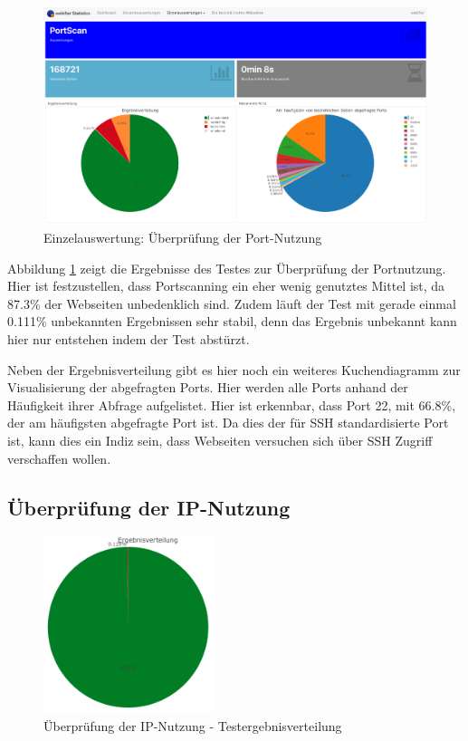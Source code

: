 \begin{figure}[H]
  \centering
  \includegraphics[width=15cm]{images/stats/portscan}
  \caption[Einzelauswertung: Überprüfung der Port-Nutzung]{Einzelauswertung: Überprüfung der Port-Nutzung\protect\footnotemark}
  \label{fig:analyse-portscan}
\end{figure}

Abbildung \ref{fig:analyse-portscan} zeigt die Ergebnisse des Testes zur Überprüfung der
Portnutzung.
Hier ist festzustellen, dass Portscanning ein eher wenig genutztes Mittel ist, da 87.3\% der Webseiten unbedenklich sind. Zudem läuft der Test mit gerade einmal 0.111\% unbekannten Ergebnissen sehr stabil, denn das Ergebnis unbekannt kann hier nur entstehen indem der Test abstürzt.

Neben der Ergebnisverteilung gibt es hier noch ein weiteres Kuchendiagramm zur Visualisierung der abgefragten Ports. Hier werden alle Ports anhand der Häufigkeit ihrer Abfrage aufgelistet. Hier ist erkennbar, dass Port 22, mit 66.8\%, der am häufigsten abgefragte Port ist. Da dies der für SSH standardisierte Port ist, kann dies ein Indiz sein, dass Webseiten versuchen sich über SSH Zugriff verschaffen wollen.

\subsection{Überprüfung der IP-Nutzung}

\begin{figure}[H]
  \centering
  \includegraphics[width=5cm]{images/stats/diaipscan}
  \caption{Überprüfung der IP-Nutzung - Testergebnisverteilung}
  \label{fig:analyse-diaipscan}
\end{figure}

